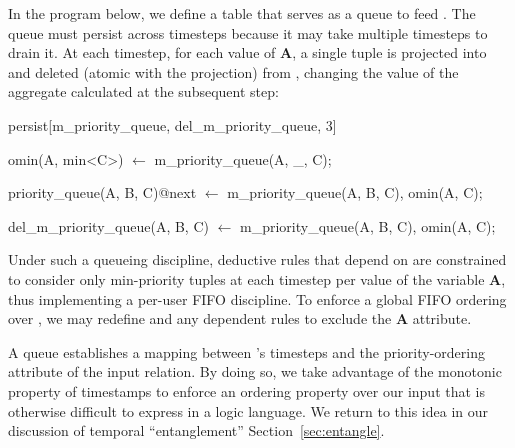 In the program below, we define a table  that
serves as a queue to feed .  The queue must persist
across timesteps because it may take multiple timesteps to drain it.  At each
timestep, for each value of \textbf{A}, a single tuple is projected into
 and deleted (atomic with the projection) from
, changing the value of the aggregate calculated
at the subsequent step:

\begin{Dedalus}
persist[m\_priority\_queue, del\_m\_priority\_queue, 3]

omin(A, min<C>) \(\leftarrow\)
  m\_priority\_queue(A, _, C);

priority_queue(A, B, C)@next \(\leftarrow\)
  m\_priority\_queue(A, B, C),
  omin(A, C);

del\_m\_priority\_queue(A, B, C) \(\leftarrow\)
  m\_priority\_queue(A, B, C),
  omin(A, C);
\end{Dedalus}

Under such a queueing discipline, deductive rules that depend on
 are constrained to consider only min-priority tuples at each timestep
per value of the variable \textbf{A}, thus implementing a per-user FIFO
discipline.  To enforce a global FIFO ordering over , we
may redefine  and any dependent rules to exclude the \textbf{A}
attribute.

A queue establishes a mapping between \slang's timesteps and the
priority-ordering attribute of the input relation. By doing so, we take
advantage of the monotonic property of timestamps to enforce an ordering
property over our input that is otherwise difficult to express in a logic
language.  We return to this idea in our discussion of temporal ``entanglement''
Section~\ref{sec:entangle}.
